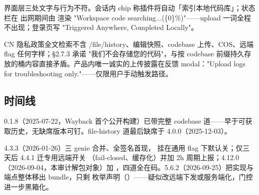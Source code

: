 界面层三处文字与行为不符。会话内 chip 称插件将自动「索引本地代码库」；状态栏在  出网期间由  渲染 "Workspace code searching...(\{0\}\%)"——upload 一词全程不出现；登录页写 "Triggered Anywhere, Completed Locally"。

CN 隐私政策全文检索不含 /file/history、编辑快照、codebase 上传、COS、远端 flag 任何字样；\S 2.7.3 承诺 "我们不会存储您的代码"，与按 codebase 前缀持久存放的桶内容直接矛盾。产品内唯一诚实的上传披露在反馈 modal："Upload logs for troubleshooting only."——仅限用户手动触发路径。

\subsection{时间线}

0.1.8（2025-07-22，Wayback 首个公开构建）已带完整 codebase 道——早于可获取历史，无缺席版本可钉。file-history 道最后缺席于 4.0.0（2025-12-03）。

4.3.3（2026-01-26）三 genie 合并、全签名首现， 挂在通用 flag 下默认关；仅三天后 4.4.1 迁专用远端开关 （fail-closed、缓存化）并加 2h 周期上报；4.12.0（2026-09-04，本审计解包对象）加 ，四道全在码。5.6.2（2026-09-25）把实现与端点整体移出 bundle，只剩  枚举声明（）——疑似改远端下发或服务端化，门控进一步黑箱化。

